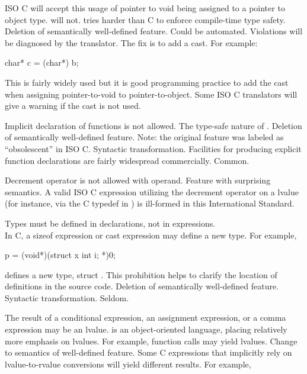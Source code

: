 ISO C will accept this usage of pointer to void being assigned
to a pointer to object type.
\Cpp{} will not.
\rationale
\Cpp{} tries harder than C to enforce compile-time type safety.
\effect
Deletion of semantically well-defined feature.
\difficulty
Could be automated.
Violations will be diagnosed by the \Cpp{} translator.
The
fix is to add a  cast.
For example:
\begin{codeblock}
char* c = (char*) b;
\end{codeblock}

\howwide
This is fairly widely used but it is good
programming practice to add the cast when assigning pointer-to-void to pointer-to-object.
Some ISO C translators will give a warning
if the cast is not used.

\change
Implicit declaration of functions is not allowed.
\rationale
The type-safe nature of \Cpp{}.
\effect
Deletion of semantically well-defined feature.
Note: the original feature was labeled as ``obsolescent'' in ISO C.
\difficulty
Syntactic transformation.
Facilities for producing explicit function declarations are fairly
widespread commercially.
\howwide
Common.

\change
Decrement operator is not allowed with  operand.
\rationale
Feature with surprising semantics.
\effect
A valid ISO C expression utilizing the decrement operator on
a  lvalue
(for instance, via the C typedef in )
is ill-formed in this International Standard.

\change
Types must be defined in declarations, not in expressions.\\
In C, a sizeof expression or cast expression may define a new type.
For example,
\begin{codeblock}
p = (void*)(struct x {int i;} *)0;
\end{codeblock}
defines a new type, struct .
\rationale
This prohibition helps to clarify the location of
definitions in the source code.
\effect
Deletion of semantically well-defined feature.
\difficulty
Syntactic transformation.
\howwide
Seldom.

%
%
%
\change
The result of a conditional expression, an assignment expression, or a comma expression may be an lvalue.
\rationale
\Cpp{} is an object-oriented language, placing relatively
more emphasis on lvalues.  For example, function calls may
yield lvalues.
\effect
Change to semantics of well-defined feature.  Some C
expressions that implicitly rely on lvalue-to-rvalue
conversions will yield different results.  For example,


